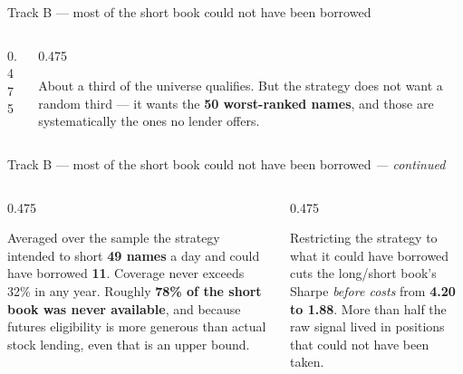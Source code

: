 \documentclass[aspectratio=169,10pt]{beamer}
\makeatletter
\newcommand{\eyebrow}[1]{\def\@eyebrow{#1}}
\newcommand{\bodytext}[1]{{\sffamily\fontsize{7.4}{9.7}\selectfont\color{ink2}#1\par}}
\newcommand{\str}[1]{{\color{ink}\bfseries #1}}
\makeatother
\begin{document}
\begin{frame}[t]{Track B — most of the short book could not have been borrowed}
\begin{columns}[T]
\begin{column}{0.475\textwidth}
\vskip0.8mm\end{column}\begin{column}{0.475\textwidth}\bodytext{About a third of the universe qualifies. But the strategy does not want a random third — it wants the \str{50 worst-ranked names}, and those are systematically the ones no lender offers.}\end{column}\end{columns}
\end{frame}
\eyebrow{Phase 4c}
\begin{frame}[t]{Track B — most of the short book could not have been borrowed \textnormal{\itshape --- continued}}
\begin{columns}[T]\begin{column}{0.475\textwidth}\bodytext{Averaged over the sample the strategy intended to short \str{49 names} a day and could have borrowed \str{11}. Coverage never exceeds 32\% in any year. Roughly \str{78\% of the short book was never available}, and because futures eligibility is more generous than actual stock lending, even that is an upper bound.}\end{column}\begin{column}{0.475\textwidth}\bodytext{Restricting the strategy to what it could have borrowed cuts the long/short book's Sharpe \emph{before costs} from \str{4.20 to 1.88}. More than half the raw signal lived in positions that could not have been taken.}\end{column}\end{columns}
\end{frame}
\eyebrow{Phase 4c}
\end{document}
